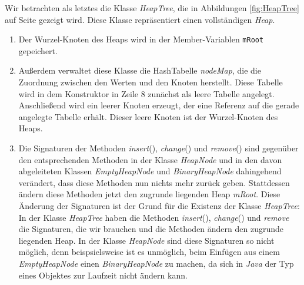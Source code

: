 Wir betrachten als letztes die
Klasse \textsl{HeapTree}, die in Abbildungen \ref{fig:HeapTree} auf Seite
\pageref{fig:HeapTree} gezeigt wird.  Diese Klasse repr\"asentiert einen vollst\"andigen
\textsl{Heap}.  
\begin{enumerate}
\item Der Wurzel-Knoten  des Heaps wird in der Member-Variablen \texttt{mRoot}
      gepeichert. 
\item Au{\ss}erdem verwaltet diese Klasse die HashTabelle \textsl{nodeMap}, die
      die Zuordnung zwischen den Werten und den Knoten herstellt.  Diese Tabelle
      wird in dem Konstruktor in Zeile 8 zun\"achst als leere Tabelle angelegt.
      Anschlie{\ss}end wird ein leerer Knoten erzeugt, der eine Referenz auf die
      gerade angelegte Tabelle erh\"alt.  Dieser leere Knoten ist der Wurzel-Knoten
      des Heaps.
\item Die Signaturen der Methoden \textsl{insert}(), \textsl{change}() und
      \textsl{remove}() sind gegen\"uber den entsprechenden Methoden in der Klasse
      \textsl{HeapNode} und in den davon abgeleiteten Klassen
      \textsl{EmptyHeapNode} und \textsl{BinaryHeapNode} dahingehend ver\"andert,
      dass diese Methoden nun nichts mehr zur\"uck geben. Stattdessen \"andern
      diese Methoden jetzt den zugrunde liegenden Heap \textsl{mRoot}.  Diese
      \"Anderung der Signaturen ist der Grund f\"ur die Existenz der Klasse
      \textsl{HeapTree}: In der Klasse \textsl{HeapTree} haben die Methoden
      \textsl{insert}(), \textsl{change}() und \textsl{remove} die Signaturen,
      die wir brauchen und die Methoden \"andern den zugrunde liegenden Heap.  
      In der Klasse \textsl{HeapNode} sind diese Signaturen so nicht m\"oglich,
      denn beispsielsweise ist es unm\"oglich, beim Einf\"ugen aus einem
      \textsl{EmptyHeapNode} einen \textsl{BinaryHeapNode} zu machen, da sich in
      \textsl{Java} der Typ eines Objektes zur Laufzeit nicht \"andern kann.
\end{enumerate}

